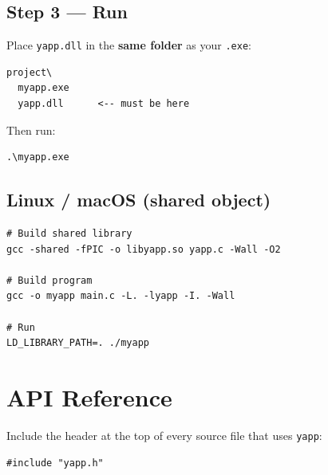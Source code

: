 \documentclass[11pt, a4paper]{article}
\newcommand{\file}[1]{\texttt{#1}}
\begin{document}
\subsection{Step 3 — Run}

Place \file{yapp.dll} in the \textbf{same folder} as your \file{.exe}:

\begin{tcolorbox}[codebox]
\begin{lstlisting}[style=shellstyle, numbers=none]
project\
  myapp.exe
  yapp.dll      <-- must be here
\end{lstlisting}
\end{tcolorbox}

Then run:

\begin{tcolorbox}[codebox]
\begin{lstlisting}[style=shellstyle, numbers=none]
.\myapp.exe
\end{lstlisting}
\end{tcolorbox}

\subsection{Linux / macOS (shared object)}

\begin{tcolorbox}[codebox]
\begin{lstlisting}[style=shellstyle, numbers=none]
# Build shared library
gcc -shared -fPIC -o libyapp.so yapp.c -Wall -O2

# Build program
gcc -o myapp main.c -L. -lyapp -I. -Wall

# Run
LD_LIBRARY_PATH=. ./myapp
\end{lstlisting}
\end{tcolorbox}

\section{API Reference}

Include the header at the top of every source file that uses \texttt{yapp}:

\begin{tcolorbox}[codebox]
\begin{lstlisting}
#include "yapp.h"
\end{lstlisting}
\end{tcolorbox}
\end{document}
